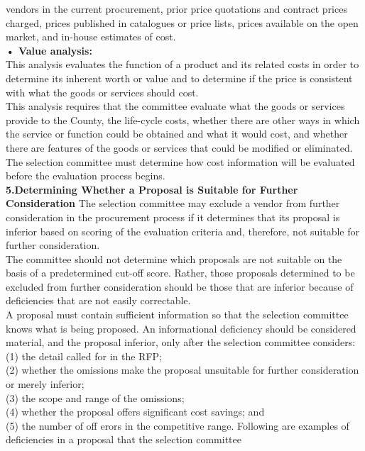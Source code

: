\documentclass[12pt]{article}
\begin{document}
vendors in the current procurement, prior price quotations and contract
prices charged, prices published in catalogues or price lists, prices
available on the open market, and in-house estimates of cost.\\
\textbf{• Value analysis:} 
\\This analysis evaluates the function of a product and its
related costs in order to determine its inherent worth or value and to
determine if the price is consistent with what the goods or services should
cost. \\This analysis requires that the committee evaluate what the goods or
services provide to the County, the life-cycle costs, whether there are
other ways in which the service or function could be obtained and what it
would cost, and whether there are features of the goods or services that
could be modified or eliminated.
\\The selection committee must determine how cost information will be evaluated
before the evaluation process begins.
\\
\textbf{5.Determining Whether a Proposal is Suitable for Further Consideration}
The selection committee may exclude a vendor from further consideration in the
procurement process if it determines that its proposal is inferior based on scoring
of the evaluation criteria and, therefore, not suitable for further consideration.
\\The committee should not determine which proposals are not suitable on the
basis of a predetermined cut-off score. Rather, those proposals determined to be
excluded from further consideration should be those that are inferior because of
deficiencies that are not easily correctable.
\\A proposal must contain sufficient information so that the selection committee
knows what is being proposed. An informational deficiency should be considered
material, and the proposal inferior, only after the selection committee considers:
\\(1) the detail called for in the RFP; \\(2) whether the omissions make the proposal unsuitable for further consideration or merely inferior; \\(3) the scope and range of
the omissions; \\(4) whether the proposal offers significant cost savings; and \\(5)
the number of off erors in the competitive range. 
Following are examples of deficiencies in a proposal that the selection committee
\end{document}
